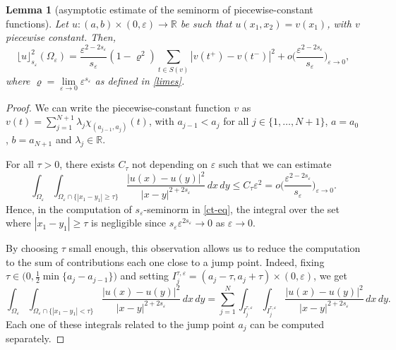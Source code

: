 \documentclass[11pt]{article}
\newtheorem{lemma}[definition]{Lemma}
\def\e{\varepsilon}
\begin{document}
\begin{lemma}[asymptotic estimate of the seminorm of piecewise-constant functions]\label{lemma-ct}  
Let $u\colon (a,b)\times (0,\e)\to \mathbb R$ be such that $u(x_1,x_2)=v(x_1)$, with 
$v$ piecewise constant.  
Then, 
\begin{equation}\label{ct-eq}
\lfloor u\rfloor_{s_\e}^2(\Omega_\e)=\frac{\e^{2-2s_\e}}{s_\e}(1-\varrho^2)\sum_{t\in S(v)} |v(t^+)-v(t^-)|^2+o\Big(\frac{\e^{2-2s_\e}}{s_\e}\Big)_{\e\to 0},
\end{equation}
where $\varrho=\lim\limits_{\e\to 0}\e^{s_\e}$ as defined in \eqref{limes}. 
\end{lemma} 
\begin{proof}
We can write the piecewise-constant function $v$ as 
$v(t)=\sum_{j=1}^{N+1} \lambda_j \chi_{(a_{j-1}, a_j)}(t)$, with 
$a_{j-1}<a_j$ for all $j\in\{1,\dots, N+1\}$, $a=a_0$, $b=a_{N+1}$ and $\lambda_j\in\mathbb R$. 


For all $\tau>0$, there exists $C_\tau$ not depending on $\e$ such that we can estimate %
\begin{equation}\label{lont_tau}
\int_{\Omega_\e}\int_{\Omega_\e\cap\{|x_1-y_1|\geq\tau\}}\frac{|u(x)-u(y)|^2}{|x-y|^{2+2s_\e}}  \, dx\, dy 
\leq C_\tau\e^{2}=o\Big(\frac{\e^{2-2s_\e}}{s_\e}\Big)_{\e\to 0}.\end{equation}
Hence, in the computation of $s_\e$-seminorm in \eqref{ct-eq}, the integral over the set where $|x_1-y_1|\geq\tau$ is negligible since $s_\e \e^{2s_\e}\to 0$ as $\e\to 0$. 

By choosing $\tau$ small enough, this observation allows us to reduce the computation to the sum of contributions each one close to a jump point. 
Indeed, fixing $\tau\in\big(0,\frac{1}{2}\min\{a_j-a_{j-1}\}\big)$ and setting $I_j^{\tau,\e}=(a_j-\tau, a_j+\tau)\times(0,\e)$, we get 
\begin{equation}\label{salti_sep}
\int_{\Omega_\e}\int_{\Omega_\e\cap\{|x_1-y_1|<\tau\}}\frac{|u(x)-u(y)|^2}{|x-y|^{2+2s_\e}}  \, dx\, dy
=\sum_{j=1}^N   \int_{I_j^{\tau,\e}}\int_{I_j^{\tau,\e}}\frac{|u(x)-u(y)|^2}{|x-y|^{2+2s_\e}}  \, dx\, dy.
\end{equation} 
Each one of these integrals related to the jump point $a_j$ can be computed separately. 


\end{proof}
\end{document}
